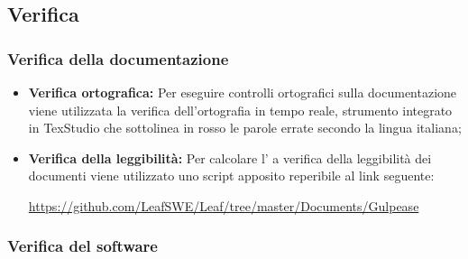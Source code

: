 \documentclass[../NormediProgetto.tex]{subfiles}
\begin{document}
	
	\subsection{Verifica}
	
	\subsubsection{Verifica della documentazione}
	
	\begin{itemize}
		\item \textbf{Verifica ortografica:} Per eseguire controlli ortografici sulla documentazione viene utilizzata la verifica dell’ortografia in tempo reale, strumento integrato in TexStudio che sottolinea in rosso le parole errate secondo la lingua italiana;
		
		\item \textbf{Verifica della leggibilità:} Per calcolare l' a verifica della leggibilità dei documenti viene utilizzato uno script apposito reperibile al link seguente:
		
		\begin{center}
			\centerline{\url{https://github.com/LeafSWE/Leaf/tree/master/Documents/Gulpease}}
		\end{center}
	\end{itemize}
	
	\subsubsection{Verifica del software}
	
\end{document}
